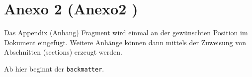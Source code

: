 \chapter{Anexo 2 (Anexo2 )}

Das Appendix (Anhang) Fragment wird einmal an der gew\"{u}nschten Position
im Dokument eingef\"{u}gt. Weitere Anh\"{a}nge k\"{o}nnen dann mittels der
Zuweisung von Abschnitten (sections) erzeugt werden.

\bigskip

Ab hier beginnt der \verb|backmatter|.
